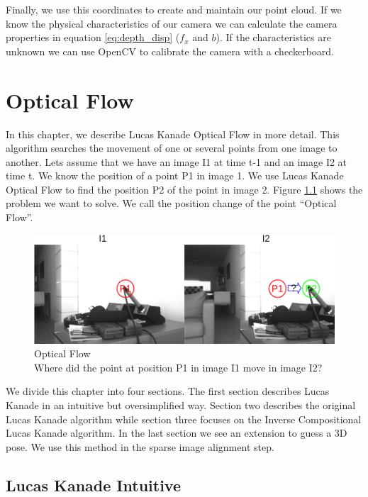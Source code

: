 \documentclass[11pt,a4paper,titlepage,oneside]{report}
\begin{document}
Finally, we use this coordinates to create and maintain our point cloud. If we know the physical characteristics of our camera we can calculate the camera properties in equation \ref{eq:depth_disp} ($f_x$ and $b$). If the characteristics are unknown we can use OpenCV to calibrate the camera \cite{calib} with a checkerboard.

\chapter{Optical Flow}\label{ch:opt_flow}

In this chapter, we describe Lucas Kanade Optical Flow in more detail. This algorithm searches the movement of one or several points from one image to another. Lets assume that we have an image I1 at time t-1 and an image I2 at time t. We know the position of a point P1 in image 1. We use Lucas Kanade Optical Flow to find the position P2 of the point in image 2. Figure \ref{fig:optical_flow} shows the problem we want to solve. We call the position change of the point ``Optical Flow''.

\begin{figure}[H]
  \includegraphics[width=1.0\textwidth]{img/optical_flow.png}
  \caption{Optical Flow\\
  Where did the point at position P1 in image I1 move in image I2?}\label{fig:optical_flow}
\end{figure}

We divide this chapter into four sections. The first section describes Lucas Kanade in an intuitive but oversimplified way. Section two describes the original Lucas Kanade algorithm while section three focuses on the Inverse Compositional Lucas Kanade algorithm. In the last section we see an extension to guess a 3D pose. We use this method in the sparse image alignment step.

\section{Lucas Kanade Intuitive}
\end{document}
